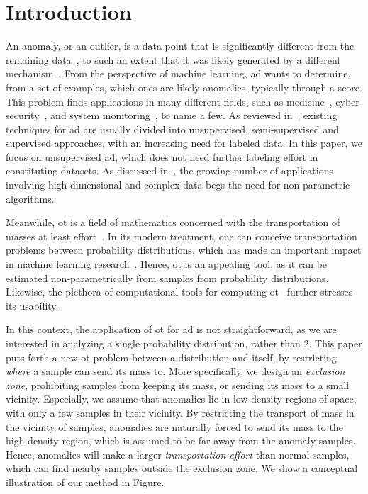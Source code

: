 \section{Introduction}\label{sec:intro}

An anomaly, or an outlier, is a data point that is significantly different from the remaining data~\citep{aggarwal2017introduction}, to such an extent that it was likely generated by a different mechanism~\citep{hawkins1980identification}. From the perspective of machine learning, \gls{ad} wants to determine, from a set of examples, which ones are likely anomalies, typically through a score. This problem finds applications in many different fields, such as medicine~\cite{salem2013sensor}, cyber-security~\cite{siddiqui2019detecting}, and system monitoring~\cite{isermann2006fault}, to name a few. As reviewed in~\cite{han2022adbench}, existing techniques for \gls{ad} are usually divided into unsupervised, semi-supervised and supervised approaches, with an increasing need for labeled data. In this paper, we focus on unsupervised \gls{ad}, which does not need further labeling effort in constituting datasets. As discussed in~\cite{livernoche2024on}, the growing number of applications involving high-dimensional and complex data begs the need for non-parametric algorithms.

Meanwhile, \gls{ot} is a field of mathematics concerned with the transportation of masses at least effort~\cite{villani2009optimal}. In its modern treatment, one can conceive transportation problems between probability distributions, which has made an important impact in machine learning research~\citep{montesuma2024recentadvancesoptimaltransport}. Hence, \gls{ot} is an appealing tool, as it can be estimated non-parametrically from samples from probability distributions. Likewise, the plethora of computational tools for computing \gls{ot}~\citep{peyre2020computationaloptimaltransport,flamary2021pot} further stresses its usability.


In this context, the application of \gls{ot} for \gls{ad} is not straightforward, as we are interested in analyzing a single probability distribution, rather than 2. This paper puts forth a new \gls{ot} problem between a distribution and itself, by restricting \emph{where} a sample can send its mass to. More specifically, we design an \emph{exclusion zone}, prohibiting samples from keeping its mass, or sending its mass to a small vicinity. Especially, we assume that anomalies lie in low density regions of space, with only a few samples in their vicinity. By restricting the transport of mass in the vicinity of samples, anomalies are naturally forced to send its mass to the high density region, which is assumed to be far away from the anomaly samples. Hence, anomalies will make a larger \emph{transportation effort} than normal samples, which can find nearby samples outside the exclusion zone. We show a conceptual illustration of our method in Figure.

